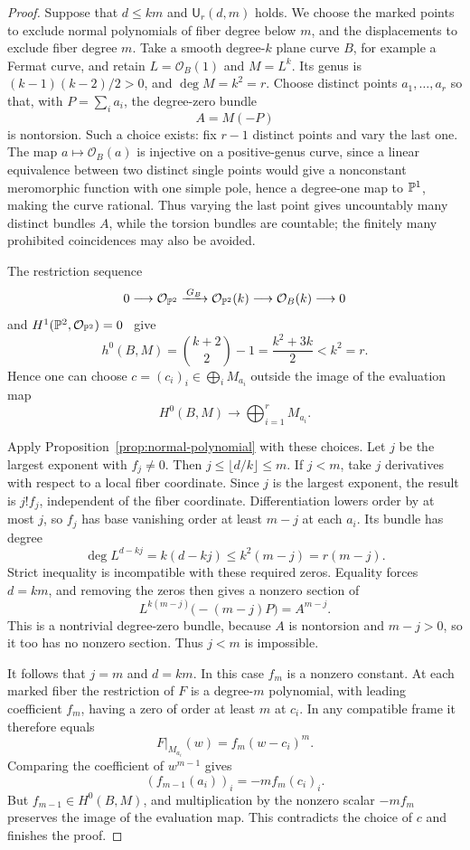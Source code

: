 \begin{proof}
Suppose that $d\le km$ and $\mathsf U_r(d,m)$ holds.  We choose
the marked points to exclude normal polynomials of fiber degree below
$m$, and the displacements to exclude fiber degree $m$.
Take a smooth degree-$k$ plane curve $B$, for example a Fermat curve,
and retain $L=\mathcal O_B(1)$ and $M=L^k$.  Its genus is
$(k-1)(k-2)/2>0$, and $\deg M=k^2=r$.  Choose distinct points
$a_1,\ldots,a_r$ so that, with $P=\sum_i a_i$, the degree-zero bundle
\[
 A=M(-P)
\]
is nontorsion.  Such a choice exists: fix $r-1$ distinct points and
vary the last one.  The map $a\mapsto\mathcal O_B(a)$ is injective
on a positive-genus curve, since a linear equivalence between two
distinct single points would give a nonconstant meromorphic function
with one simple pole, hence a degree-one map to $\mathbb P^1$, making the
curve rational.  Thus varying the last point gives uncountably many
distinct bundles $A$, while the torsion bundles are countable; the
finitely many prohibited coincidences may also be avoided.

The restriction sequence
\[
 0\longrightarrow\mathcal O_{\mathbb P^2}
 \xrightarrow{\,G_B\,}\mathcal O_{\mathbb P^2}(k)
 \longrightarrow\mathcal O_B(k)\longrightarrow0
\]
and $H^1(\mathbb P^2,\mathcal O_{\mathbb P^2})=0$~\cite[Tag~01XT]{Stacks} give
\[
 h^0(B,M)=\binom{k+2}{2}-1
         =\frac{k^2+3k}{2}<k^2=r.
\]
Hence one can choose
$c=(c_i)_i\in\bigoplus_i M_{a_i}$ outside the image of the evaluation
map
\[
 H^0(B,M)\longrightarrow\bigoplus_{i=1}^r M_{a_i}.
\]

Apply Proposition~\ref{prop:normal-polynomial} with these choices.  Let $j$
be the largest exponent with $f_j\ne0$.  Then
$j\le\lfloor d/k\rfloor\le m$.  If $j<m$, take $j$ derivatives with
respect to a local fiber coordinate.  Since $j$ is the largest
exponent, the result is $j!f_j$, independent of the fiber coordinate.
Differentiation lowers order by at most $j$, so $f_j$ has base
vanishing order at least $m-j$ at each $a_i$.  Its bundle has degree
\[
 \deg L^{d-kj}=k(d-kj)\le k^2(m-j)=r(m-j).
\]
Strict inequality is incompatible with these required zeros.  Equality
forces $d=km$, and removing the zeros then gives a nonzero section of
\[
 L^{k(m-j)}\bigl(-(m-j)P\bigr)=A^{m-j}.
\]
This is a nontrivial degree-zero bundle, because $A$ is nontorsion and
$m-j>0$, so it too has no nonzero section.  Thus $j<m$ is impossible.

It follows that $j=m$ and $d=km$.  In this case $f_m$ is a nonzero
constant.  At each marked fiber the restriction of $F$ is a degree-$m$
polynomial, with leading coefficient $f_m$, having a zero of order at
least $m$ at $c_i$.  In any compatible frame it therefore equals
\[
 F|_{M_{a_i}}(w)=f_m(w-c_i)^m.
\]
Comparing the coefficient of $w^{m-1}$ gives
\[
 (f_{m-1}(a_i))_i=-m f_m(c_i)_i.
\]
But $f_{m-1}\in H^0(B,M)$, and multiplication by the nonzero scalar
$-m f_m$ preserves the image of the evaluation map.  This contradicts
the choice of $c$ and finishes the proof.
\end{proof}

